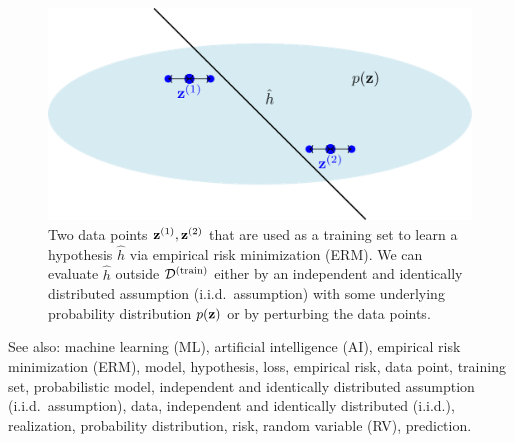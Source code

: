 \documentclass{article}
\begin{document}
 \begin{figure}[H]
 \centering
 \includegraphics[width=0.8\linewidth]{blog_posts/images/generalization_tikz.png}
 \caption{Two data points ${\bf z}^{(1)},{\bf z}^{(2)}$ that are used as a training set
 to learn a hypothesis $\hat{h}$ via empirical risk minimization (ERM). We can evaluate $\hat{h}$
 outside $\mathcal{D}^{(\rm train)}$ either by an independent and identically distributed assumption (i.i.d.\ assumption) with some underlying probability distribution $p({\bf z})$
 or by perturbing the data points.}
 \label{fig:polynomial_fit_dict}
 \end{figure}
 See also: machine learning (ML), artificial intelligence (AI), empirical risk minimization (ERM), model, hypothesis, loss, empirical risk, data point, training set, probabilistic model, independent and identically distributed assumption (i.i.d.\ assumption), data, independent and identically distributed (i.i.d.), realization, probability distribution, risk, random variable (RV), prediction.
 
\end{document}
